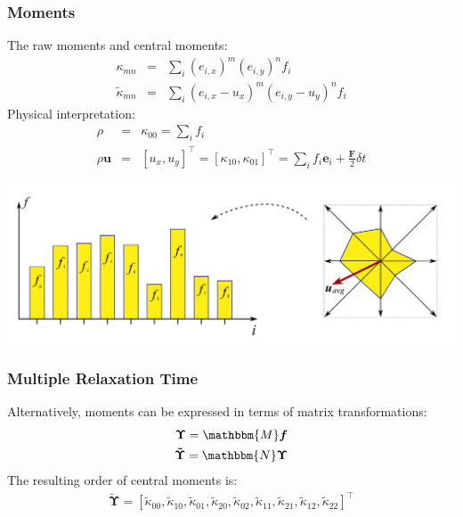 \documentclass[10pt]{beamer}
\begin{document}
\begin{frame}[plain]\frametitle{Moments}
The raw moments and central moments:
\begin{eqnarray}
\kappa_{mn} &=& \sum_{i}(e_{i, x})^m ( e_{i, y})^n f_{i} \nonumber \label{eq:raw_mom_def} \\
\tilde{\kappa}_{mn} &=& \sum_{i} ( e_{i, x} - u_x)^m ( e_{i, y} - u_y)^n f_{i} \nonumber \label{eq:cm_mom_def}
\end{eqnarray}
\pause
Physical interpretation:
\begin{eqnarray} 
\rho &=& \kappa_{00} = \sum_i f_i \nonumber %
 \\
\rho \textbf{u} &=& [u_x, u_y]^\top = [ \kappa_{10}, \kappa_{01}]^\top 
= \sum_i f_i \textbf{e}_i + \frac{\textbf{F}}{2} \delta t \nonumber 
\end{eqnarray}

  \includegraphics[width = 0.8 \textwidth]
   {obrazki/latticeVelocities_concept.png} 
\end{frame}

\begin{frame}\frametitle{Multiple Relaxation Time}
Alternatively, moments can be expressed in terms of matrix transformations:
\begin{eqnarray}
\boldsymbol{\Upsilon} = \mathbbm{M} \boldsymbol{f} \nonumber \\
\boldsymbol{\tilde{\Upsilon}}= \mathbbm{N} \boldsymbol{\Upsilon} \nonumber
\end{eqnarray}
The resulting order of central moments is:
\begin{eqnarray} 
\boldsymbol{\tilde{\Upsilon}} = [
\tilde{\kappa}_{00}, 
\tilde{\kappa}_{10}, 
\tilde{\kappa}_{01}, 
\tilde{\kappa}_{20}, 
\tilde{\kappa}_{02}, 
\tilde{\kappa}_{11}, 
\tilde{\kappa}_{21}, 
\tilde{\kappa}_{12}, 
\tilde{\kappa}_{22}]^\top \nonumber
\end{eqnarray} 
\end{frame}
\end{document}
